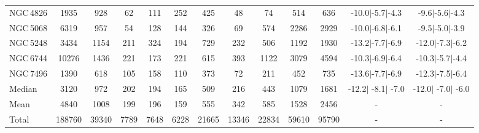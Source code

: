 \begin{table*}
\begin{center}
\begin{tabular}{lcccccccccccc}
NGC\,4826 & 1935 & 928 & 62 & 111 & 252 & 425 & 48 & 74 & 514 & 636 & -10.0$\vert$-5.7$\vert$-4.3 & -9.6$\vert$-5.6$\vert$-4.3 \\ 
NGC\,5068 & 6319 & 957 & 54 & 128 & 144 & 326 & 69 & 574 & 2286 & 2929 & -10.0$\vert$-6.8$\vert$-6.1 & -9.5$\vert$-5.0$\vert$-3.9 \\ 
NGC\,5248 & 3434 & 1154 & 211 & 324 & 194 & 729 & 232 & 506 & 1192 & 1930 & -13.2$\vert$-7.7$\vert$-6.9 & -12.0$\vert$-7.3$\vert$-6.2 \\ 
NGC\,6744 & 10276 & 1436 & 221 & 173 & 221 & 615 & 393 & 1122 & 3079 & 4594 & -10.3$\vert$-6.9$\vert$-6.4 & -10.3$\vert$-5.7$\vert$-4.4 \\ 
NGC\,7496 & 1390 & 618 & 105 & 158 & 110 & 373 & 72 & 211 & 452 & 735 & -13.6$\vert$-7.7$\vert$-6.9 & -12.3$\vert$-7.5$\vert$-6.4 \\ 
\hline
Median & 3120 & 972 & 202 & 194 & 165 & 509 & 216 & 443 & 1079 & 1681 & -12.2$\vert$ -8.1$\vert$ -7.0 & -12.0$\vert$ -7.0$\vert$ -6.0 \\ 
Mean & 4840 & 1008 & 199 & 196 & 159 & 555 & 342 & 585 & 1528 & 2456 & - & - \\ 
Total & 188760 & 39340 & 7789 & 7648 & 6228 & 21665 & 13346 & 22834 & 59610 & 95790 & - & - \\ 
\hline
\hline
\end{tabular} 
\end{center}
\end{table*}
%